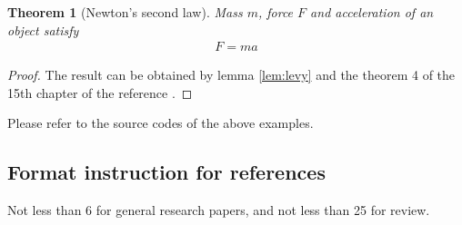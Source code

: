 ﻿\documentclass[UTF8]{csoarticle}
\newtheorem{theorem}{Theorem}
\begin{document}
\begin{theorem}[Newton’s second law]\label{thm:newton}
Mass $m$, force $F$ and acceleration of an object satisfy
\begin{align}\label{eq:f-eq-ma}
    F = m a
\end{align}
\end{theorem}
\begin{proof}
The result can be obtained by lemma \ref{lem:levy} and the theorem 4 of the 15th chapter of the reference \cite{bib1}.
\end{proof}

Please refer to the source codes of the above examples.

\subsection{Format instruction for references}

Not less than 6 for general research papers, and not less than 25 for review.
\end{document}
